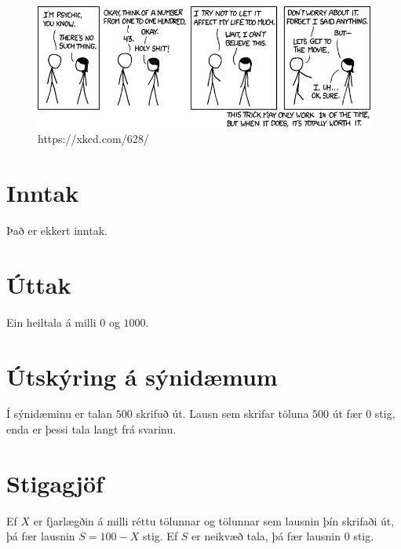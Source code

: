 
\begin{figure}[h]
    \centering
    \includegraphics[scale=0.5]{psychic.png}
    \caption{https://xkcd.com/628/}
\end{figure}

\section*{Inntak}
Það er ekkert inntak.

\section*{Úttak}
Ein heiltala á milli $0$ og $1000$.

\section*{Útskýring á sýnidæmum}
Í sýnidæminu er talan $500$ skrifuð út. Lausn sem skrifar töluna $500$ út fær $0$ stig, enda er þessi tala langt frá svarinu.

\section*{Stigagjöf}
Ef $X$ er fjarlægðin á milli réttu tölunnar og tölunnar sem lausnin þín skrifaði út, þá fær lausnin $S = 100-X$ stig. Ef $S$ er neikvæð tala, þá fær lausnin $0$ stig.
